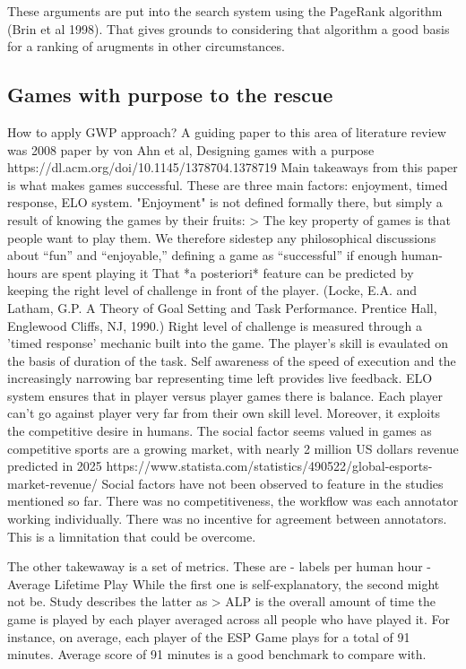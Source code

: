 \documentclass{article}
\begin{document}
These arguments are put into the search system using the PageRank algorithm (Brin et al 1998). 
That gives grounds to considering that algorithm a good basis for a ranking of arugments in other circumstances.

\subsection{Games with purpose to the rescue}
How to apply GWP approach?
A guiding paper to this area of literature review was 2008 paper by von Ahn et al, Designing games with a purpose https://dl.acm.org/doi/10.1145/1378704.1378719
Main takeaways from this paper is what makes games successful.
These are three main factors: enjoyment, timed response, ELO system.
"Enjoyment" is not defined formally there, but simply a result of knowing the games by their fruits:
> The key property of games is that people want to play them. We therefore sidestep any philosophical discussions about “fun” and “enjoyable,” defining a game as “successful” if enough human-hours are spent playing it
That  *a posteriori* feature can be predicted by keeping the right level of challenge in front of the player. (Locke, E.A. and Latham, G.P. A Theory of Goal Setting and Task Performance. Prentice Hall, Englewood Cliffs, NJ, 1990.)
Right level of challenge is measured through a 'timed response' mechanic built into the game.
The player's skill is evaulated on the basis of duration of the task. 
Self awareness of the speed of execution and the increasingly narrowing bar representing time left provides live feedback.
ELO system ensures that in player versus player games there is balance. Each player can't go against player very far from their own skill level.
Moreover, it exploits the competitive desire in humans.
The social factor seems valued in games as competitive sports are a growing market, with nearly 2 million US dollars revenue predicted in 2025
https://www.statista.com/statistics/490522/global-esports-market-revenue/
Social factors have not been observed to feature in the studies mentioned so far.
There was no competitiveness, the workflow was each annotator working individually.
There was no incentive for agreement between annotators.
This is a limnitation that could be overcome.

The other takewaway is a set of metrics. These are
- labels per human hour
- Average Lifetime Play
While the first one is self-explanatory, the second might not be.
Study describes the latter as 
> ALP is the overall amount of time the game is played by each player averaged across all people who have played it. For instance, on average, each player of the ESP Game plays for a total of 91 minutes.
Average score of 91 minutes is a good benchmark to compare with.
\end{document}

